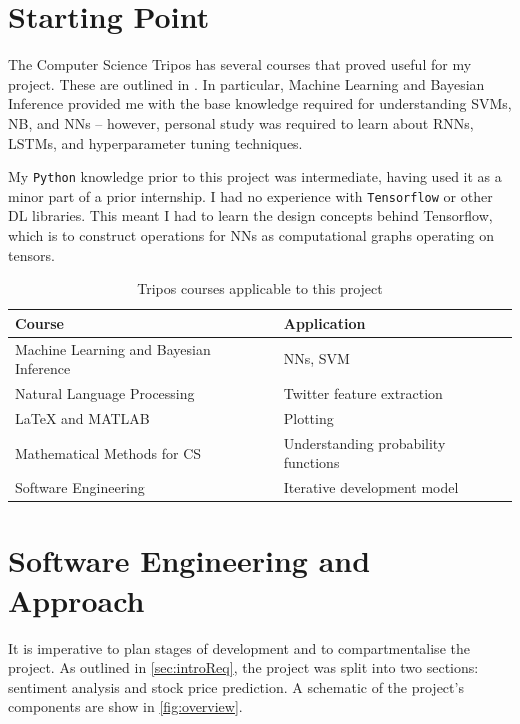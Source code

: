 \documentclass[12pt,a4paper,twoside,openright]{report}
\begin{document}
\section{Starting Point}
\label{sec:introStart}

The Computer Science Tripos has several courses that proved useful for my project.
These are outlined in . In particular, Machine Learning and
Bayesian Inference provided me with the base knowledge required for understanding
SVMs, NB, and NNs -- however, personal study was required to
learn about RNNs, LSTMs, and hyperparameter tuning techniques.

My \texttt{Python} knowledge prior to this project was intermediate, having used it
as a minor part of a prior internship. I had no experience with \texttt{Tensorflow}
or other DL libraries. This meant I had to learn the design concepts
behind Tensorflow, which is to construct operations for NNs as
computational graphs operating on tensors. 

\begin{table}[H]
\centering
\begin{tabular}{p{8cm} l}
\toprule
\textbf{Course}                              & \textbf{Application} \\ \midrule
Machine Learning and Bayesian Inference      &  NNs, SVM                    \\
Natural Language Processing                  &  Twitter feature extraction                    \\
LaTeX and MATLAB                             &  Plotting       \\
Mathematical Methods for CS    &  Understanding probability functions            \\
Software Engineering                         &  Iterative development model                    \\\bottomrule
\end{tabular}
\caption{Tripos courses applicable to this project}
\label{table:courses}
\end{table}

\section{Software Engineering and Approach}
\label{sec:introImpl}

It is imperative to plan stages of
development and to compartmentalise the project. As outlined in \cref{sec:introReq},
the project was split into two sections: sentiment analysis and stock price prediction. A
schematic of the project's components are show in \cref{fig:overview}.
\end{document}
